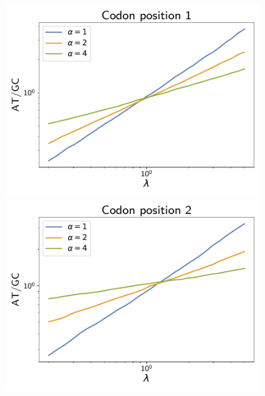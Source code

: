 \documentclass{article}
\begin{document}
\begin{figure}[h]
    \centering
    \begin{minipage}{0.32\linewidth}
        \includegraphics[width=\linewidth, page=1]{simulations/at_over_gc_1}
    \end{minipage}
    \hfill
    \begin{minipage}{0.32\linewidth}
        \includegraphics[width=\linewidth, page=1]{simulations/at_over_gc_2}
    \end{minipage}
    \hfill
    \begin{minipage}{0.32\linewidth}

\end{minipage}
\end{figure}
\end{document}
